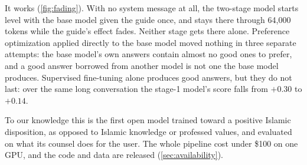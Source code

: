 \documentclass[11pt]{article}
\begin{document}
It works (\cref{fig:fading}). With no system message at all,
the two-stage model starts level with the base model given the guide
once, and stays there through 64{,}000 tokens while the guide's effect
fades. Neither stage gets there alone. Preference optimization applied
directly to the base model moved nothing in three separate attempts: the
base model's own answers contain almost no good ones to prefer, and a
good answer borrowed from another model is not one the base model
produces. Supervised fine-tuning alone
produces good answers, but they do not last: over the same long
conversation the stage-1 model's score falls from $+0.30$ to $+0.14$.

To our knowledge this is the first open model trained toward a
positive Islamic disposition, as opposed to Islamic knowledge or
professed values, and evaluated on what its counsel does for the user.
The whole pipeline cost under \$100 on one GPU, and the code and data
are released (\cref{sec:availability}).
\end{document}

